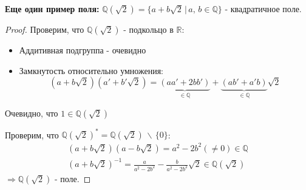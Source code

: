 \textbf{Еще один пример поля:} $\mathbb{Q}(\sqrt{2}) = \{ a + b\sqrt{2} \, | \, a, \, b \in \mathbb{Q} \} $ - квадратичное поле.
\begin{proof} \quad
  
    Проверим, что $\mathbb{Q}(\sqrt{2})$ - подкольцо в $\mathbb{R}$:
    \begin{itemize}
        \item Аддитивная подгруппа - очевидно 
        \item Замкнутость относительно умножения:
        \[ (a + b\sqrt{2})(a' + b'\sqrt{2}) = \underbrace{(aa' + 2bb')}_{\in \mathbb{Q}} + \underbrace{(ab' + a'b)}_{\in \mathbb{Q}}\sqrt{2} \] 
    \end{itemize}
    Очевидно, что $1 \in \mathbb{Q}(\sqrt{2})$
  
    Проверим, что $\mathbb{Q}(\sqrt{2})^* = \mathbb{Q}(\sqrt{2}) \, \backslash \, \{ 0 \}$:
    \begin{gather*}
        (a + b\sqrt{2})(a - b\sqrt{2}) = a^2 - 2b^2 (\neq 0)\in \mathbb{Q} \\
        (a + b\sqrt{2})^{-1} = \frac{a}{a^2 - 2b^2} - \frac{b}{a^2 - 2b^2}\sqrt{2} \in \mathbb{Q}(\sqrt{2})
    \end{gather*}
    $\Rightarrow \mathbb{Q}(\sqrt{2})$ - поле.
\end{proof}
